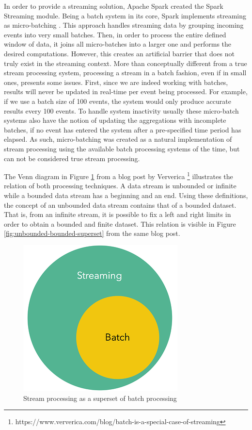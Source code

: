 In order to provide a streaming solution, Apache Spark created the Spark Streaming \cite{SparkStreaming} module. Being a batch system in its core, Spark implements streaming as micro-batching \cite{SparkStreamingPaper}. This approach handles streaming data by grouping incoming events into very small batches. Then, in order to process the entire defined window of data, it joins all micro-batches into a larger one and performs the desired computations. However, this creates an artificial barrier that does not truly exist in the streaming context. More than conceptually different from a true stream processing system, processing a stream in a batch fashion, even if in small ones, presents some issues. First, since we are indeed working with batches, results will never be updated in real-time per event being processed. For example, if we use a batch size of 100 events, the system would only produce accurate results every 100 events. To handle system inactivity usually these micro-batch systems also have the notion of updating the aggregations with incomplete batches, if no event has entered the system after a pre-specified time period has elapsed. As such, micro-batching was created as a natural implementation of stream processing using the available batch processing systems of the time, but can not be considered true stream processing.

The Venn diagram in Figure \ref{fig:stream-superset} from a blog post by Ververica \footnote{https://www.ververica.com/blog/batch-is-a-special-case-of-streaming} illustrates the relation of both processing techniques. A data stream is unbounded or infinite while a bounded data stream has a beginning and an end. Using these definitions, the concept of an unbounded data stream contains that of a bounded dataset. That is, from an infinite stream, it is possible to fix a left and right limits in order to obtain a bounded and finite dataset. This relation is visible in Figure \ref{fig:unbounded-bounded-superset} from the same blog post.

\begin{figure}[!htb]
    \begin{center}
      \includegraphics[scale=0.5]{figures/streaming-subset-batch.png}
      \caption{Stream processing as a superset of batch processing}
      \label{fig:stream-superset}
    \end{center}
\end{figure}

